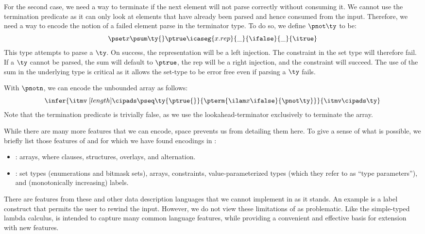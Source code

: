 For the second case, we need a way to terminate if the next element
will not parse correctly without consuming it. We cannot use the
termination predicate as it can only look at elements that have
already been parsed and hence consumed from the input. Therefore, we
need a way to encode the notion of a failed element parse in the
terminator type. To do so, we define $\pnot \ty$ to be:
 {\small
\[
\pset x {\psum \ty {} \ptrue} {\icaseg {x.rep} {\_}
  {\ifalse} {\_} {\itrue}}
\]}
\noindent
This type attempts to parse a $\ty$. On success, the representation will be a left
injection. The constraint in the set type will therefore fail. If a
$\ty$ cannot be parsed, the sum will default to $\ptrue$, the rep will
be a right injection, and the constraint will succeed. The use of the
sum in the underlying type is critical as it allows the set-type to be
error free even if parsing a $\ty$ fails.

With $\pnotn$, we can encode the unbounded \datascript{} array as
follows:
\[
  \infer{
    \itmv \; [{length}] \cipads 
    \pseq \ty {\ptrue{}} {\pterm {\ilam x {} \ifalse} {\pnot \ty}}
  }{ 
    \itmv \cipads \ty
  }
\]
Note that the termination predicate is trivially false, as we use the
lookahead-terminator exclusively to terminate the array.

While there are many more features that we can encode, space prevents us from
detailing them here. To give a sense of what is possible, we
briefly list those features of \datascript{} and \packettypes{} for
which we have found encodings in \ddc{}:
\begin{itemize}
\item \packettypes{}: arrays, where clauses, structures, overlays,
  and alternation.
\item \datascript{}: set types (enumerations and bitmask sets),
  arrays, constraints, value-parameterized types (which they refer to
  as ``type parameters''), and (monotonically increasing) labels.
\end{itemize}

There are features from these and other data description languages
that we cannot implement in \ddc{} as it stands.  An example is a label construct that permits the user to rewind the input. However, we do not view these limitations of
\ddc{} as problematic. Like the simple-typed lambda calculus, \ddc{}
is intended to capture many common language features, while providing
a convenient and effective basis for extension with new features.


